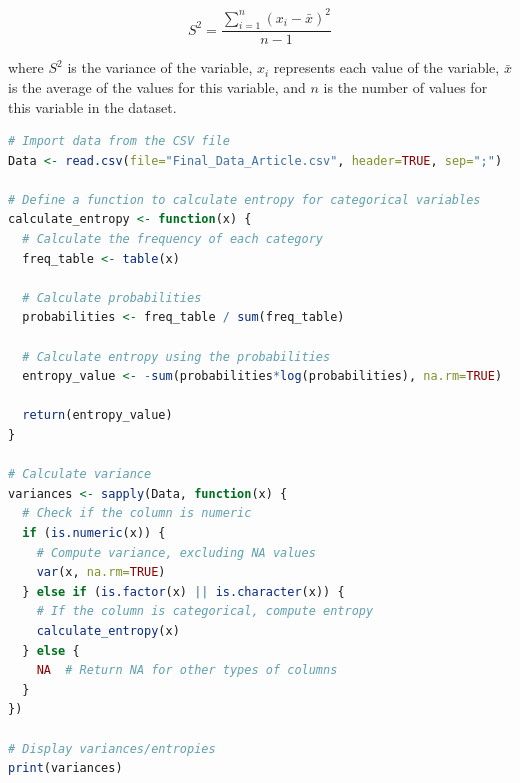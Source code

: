 \begin{equation}\label{variance}
    S^2 = \frac{\sum_{i=1}^{n} (x_i - \bar{x})^2}{n-1}
\end{equation}

where $S^2$ is the variance of the variable, $x_i$ represents each value of the variable, $\bar{x}$ is the average of the values for this variable, and $n$ is the number of values for this variable in the dataset.

\begin{lstlisting}[label=lst:variance,language=R,caption=RStudio script to calculate the variance of each numerical and categorical variables in our final dataset.]
# Import data from the CSV file
Data <- read.csv(file="Final_Data_Article.csv", header=TRUE, sep=";")

# Define a function to calculate entropy for categorical variables
calculate_entropy <- function(x) {
  # Calculate the frequency of each category
  freq_table <- table(x)

  # Calculate probabilities
  probabilities <- freq_table / sum(freq_table)

  # Calculate entropy using the probabilities
  entropy_value <- -sum(probabilities*log(probabilities), na.rm=TRUE)

  return(entropy_value)
}

# Calculate variance
variances <- sapply(Data, function(x) {
  # Check if the column is numeric
  if (is.numeric(x)) {
    # Compute variance, excluding NA values
    var(x, na.rm=TRUE)
  } else if (is.factor(x) || is.character(x)) {
    # If the column is categorical, compute entropy
    calculate_entropy(x)
  } else {
    NA  # Return NA for other types of columns
  }
})

# Display variances/entropies
print(variances)
\end{lstlisting}

